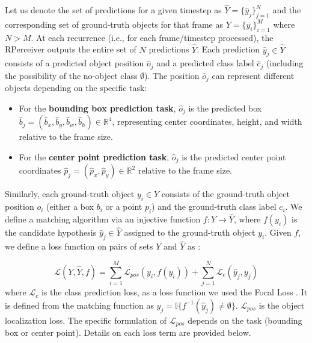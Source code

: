 Let us denote the set of predictions for a given timestep as $ \hat{Y} = \{\hat{y}_j\}_{j=1}^N $ and the corresponding set of ground-truth objects for that frame as $ Y = \{y_i\}_{i=1}^M $ where $ N > M $. At each recurrence (i.e., for each frame/timestep processed), the RPerceiver outputs the entire set of $N$ predictions $\hat{Y}$. Each prediction $\hat{y}_j \in \hat{Y}$ consists of a predicted object position $\hat{o}_j$ and a predicted class label $\hat{c}_j$ (including the possibility of the no-object class $\emptyset$). The position $\hat{o}_j$ can represent different objects depending on the specific task:
\begin{itemize}
    \item For the \textbf{bounding box prediction task}, $\hat{o}_j$ is the predicted box $\hat{b}_j = (\hat{b}_x, \hat{b}_y, \hat{b}_w, \hat{b}_h) \in \mathbb{R}^4$, representing center coordinates, height, and width relative to the frame size.
    \item For the \textbf{center point prediction task}, $\hat{o}_j$ is the predicted center point coordinates $\hat{p}_j = (\hat{p}_x, \hat{p}_y) \in \mathbb{R}^2$ relative to the frame size.
\end{itemize}
Similarly, each ground-truth object $y_i \in Y$ consists of the ground-truth object position $o_i$ (either a box $b_i$ or a point $p_i$) and the ground-truth class label $c_i$.
We define a matching algorithm via an injective function $f: Y \rightarrow \hat{Y}$, where $f(y_i)$ is the candidate hypothesis $\hat{y}_j \in \hat{Y}$ assigned to the ground-truth object $y_i$. Given $f$, we define a loss function on pairs of sets $Y$ and $\hat{Y}$ as \cite{stewartEndtoendPeopleDetection2015}:

\begin{equation} \label{eq:set_loss}
\mathcal{L}(Y, \hat{Y}, f ) = \sum_{i=1}^{M} \mathcal{L}_{pos}(y_i, f(y_i)) +  \sum_{j=1}^{N} \mathcal{L}_c (\hat{y}_j, y_j)
\end{equation}
where $\mathcal{L}_c$ is the class prediction loss, as a loss function we used the Focal Loss \cite{linFocalLossDense2018}. It is defined from the matching function as $ y_j = \mathbb{I}\{f^{-1}(\hat{y}_j) \neq \emptyset\} $.  
$\mathcal{L}_{pos}$ is the object localization loss. The specific formulation of $\mathcal{L}_{pos}$ depends on the task (bounding box or center point). Details on each loss term are provided below. 

